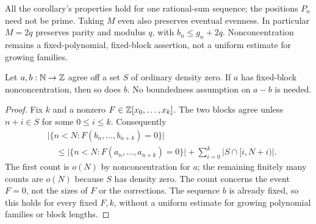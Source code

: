 \documentclass[11pt]{article}
\begin{document}
All the corollary's properties hold for one rational-sum sequence; the
positions $P_n$ need not be prime.  Taking $M$ even also preserves eventual
evenness.  In particular $M=2q$ preserves parity and modulus $q$, with
$b_n\le g_n+2q$.  Nonconcentration remains a fixed-polynomial, fixed-block
assertion, not a uniform estimate for growing families.

\begin{proposition}\label{long251:res:sparse-nonconcentration}
Let $a,b:\mathbb{N}\to\mathbb{Z}$ agree off a set $S$ of ordinary density zero.
If $a$ has fixed-block nonconcentration, then so does $b$.
No boundedness assumption on $a-b$ is needed.
\end{proposition}
\begin{proof}
Fix $k$ and a nonzero $F\in\mathbb{Z}[x_0,\ldots,x_k]$.  The two blocks agree
unless $n+i\in S$ for some $0\le i\le k$.  Consequently
\[
 \begin{aligned}
 &\bigl|\{n<N:F(b_n,\ldots,b_{n+k})=0\}\bigr|\\
 &\quad\le\bigl|\{n<N:F(a_n,\ldots,a_{n+k})=0\}\bigr|
       +\sum_{i=0}^k|S\cap[i,N+i)|.
 \end{aligned}
\]
The first count is $o(N)$ by nonconcentration for $a$; the remaining
finitely many counts are $o(N)$ because $S$ has density zero.
The count concerns the event $F=0$, not the sizes of $F$ or the
corrections.  The sequence $b$ is already fixed, so this holds for
every fixed $F,k$, without a uniform estimate for growing polynomial
families or block lengths.
\end{proof}
\end{document}
